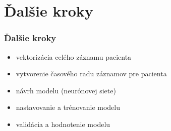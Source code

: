 \documentclass[slovak]{beamer}
\begin{document}
\section{Ďalšie kroky}

\begin{frame}
	\frametitle{Ďalšie kroky}
	\begin{itemize}
		\item<1> vektorizácia celého záznamu pacienta
		\item<1> vytvorenie časového radu záznamov pre pacienta
		\item<1> návrh modelu (neurónovej siete)
		\item<1> nastavovanie a trénovanie modelu
		\item<1> validácia a hodnotenie modelu
	\end{itemize}
	
	
\end{frame}
\end{document}
